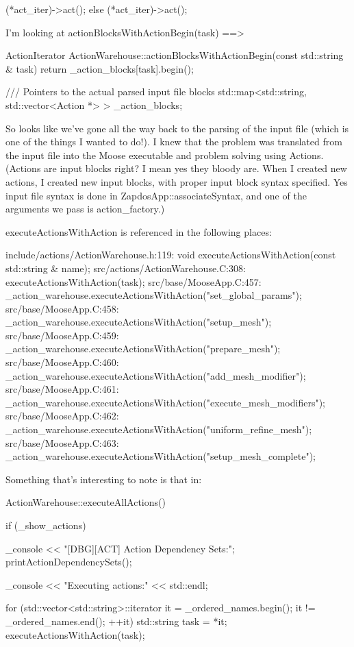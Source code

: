 {{{{      (*act_iter)->act();
    }
    else
      (*act_iter)->act();
  }
}

I'm looking at actionBlocksWithActionBegin(task) ==>

ActionIterator
ActionWarehouse::actionBlocksWithActionBegin(const std::string & task)
{
  return _action_blocks[task].begin();
}

  /// Pointers to the actual parsed input file blocks
  std::map<std::string, std::vector<Action *> > _action_blocks;

So looks like we've gone all the way back to the parsing of the input file (which is one of the things I wanted to do!). I knew that the problem was translated from the input file into the Moose executable and problem solving using Actions. (Actions are input blocks right? I mean yes they bloody are. When I created new actions, I created new input blocks, with proper input block syntax specified. Yes input file syntax is done in ZapdosApp::associateSyntax, and one of the arguments we pass is action_factory.)

executeActionsWithAction is referenced in the following places:

include/actions/ActionWarehouse.h:119:  void executeActionsWithAction(const std::string & name);
src/actions/ActionWarehouse.C:308:    executeActionsWithAction(task);
src/base/MooseApp.C:457:  _action_warehouse.executeActionsWithAction("set_global_params");
src/base/MooseApp.C:458:  _action_warehouse.executeActionsWithAction("setup_mesh");
src/base/MooseApp.C:459:  _action_warehouse.executeActionsWithAction("prepare_mesh");
src/base/MooseApp.C:460:  _action_warehouse.executeActionsWithAction("add_mesh_modifier");
src/base/MooseApp.C:461:  _action_warehouse.executeActionsWithAction("execute_mesh_modifiers");
src/base/MooseApp.C:462:  _action_warehouse.executeActionsWithAction("uniform_refine_mesh");
src/base/MooseApp.C:463:  _action_warehouse.executeActionsWithAction("setup_mesh_complete");

Something that's interesting to note is that in:

ActionWarehouse::executeAllActions()
{
  if (_show_actions)
  {
    _console << "[DBG][ACT] Action Dependency Sets:\n";
    printActionDependencySets();

    _console << "\n[DBG][ACT] Executing actions:" << std::endl;
  }

  for (std::vector<std::string>::iterator it = _ordered_names.begin(); it != _ordered_names.end(); ++it)
  {
    std::string task = *it;
    executeActionsWithAction(task);
  }
}

}

